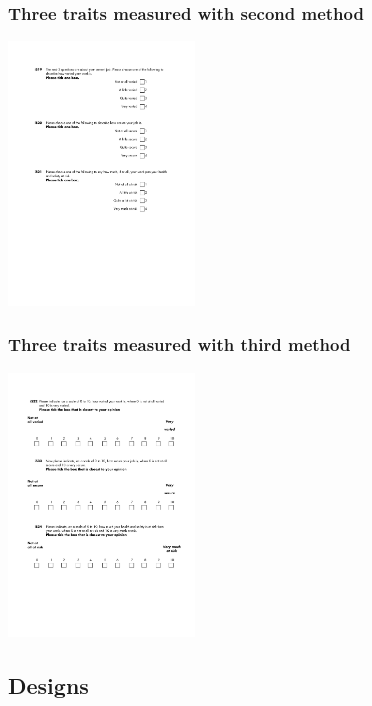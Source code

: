 \documentclass{beamer}
\begin{document}
\begin{frame}
	\frametitle{Three traits measured with second method}
		\includegraphics[height=7cm]{i/method-2.pdf}
\end{frame}

\begin{frame}
	\frametitle{Three traits measured with third method}
		\includegraphics[height=7cm]{i/method-3.pdf}
\end{frame}

\subsection{Designs}
\end{document}
